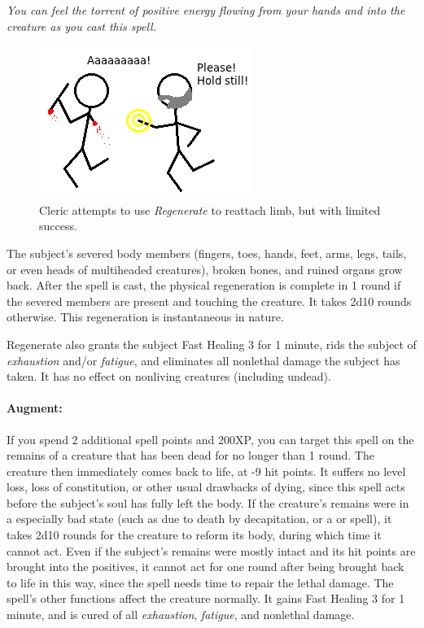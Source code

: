 \emph{You can feel the torrent of positive energy flowing from your hands and into the creature as you cast this spell.}

\begin{figure}
  \caption{Cleric attempts to use \emph{Regenerate} to reattach limb, but with limited success.}
  \centering
    \includegraphics{Pics/Regenerate.png}
\end{figure}

The subject's severed body members (fingers, toes, hands, feet, arms, legs, tails, or even heads of multiheaded creatures), broken bones, and ruined organs grow back. 
After the spell is cast, the physical regeneration is complete in 1 round if the severed members are present and touching the creature. It takes 2d10 rounds otherwise.
This regeneration is instantaneous in nature.

Regenerate also grants the subject Fast Healing 3 for 1 minute, rids the subject of \emph{exhaustion} and/or \emph{fatigue}, and eliminates all nonlethal damage the subject has taken.
It has no effect on nonliving creatures (including undead).

\paragraph{Augment:} If you spend 2 additional spell points and 200XP, you can target this spell on the remains of a creature that has been dead for no longer than 1 round.
The creature then immediately comes back to life, at -9 hit points. It suffers no level loss, loss of constitution, or other usual drawbacks of dying, since this spell acts before the subject's soul has fully left the body.
If the creature's remains were in a especially bad state (such as due to death by decapitation, or a  or  spell), it takes 2d10 rounds for the creature to reform its body, during which time it cannot act.
Even if the subject's remains were mostly intact and its hit points are brought into the positives, it cannot act for one round after being brought back to life in this way, since the spell needs time to repair the lethal damage.
The spell's other functions affect the creature normally. It gains Fast Healing 3 for 1 minute, and is cured of all \emph{exhaustion}, \emph{fatigue}, and nonlethal damage.
